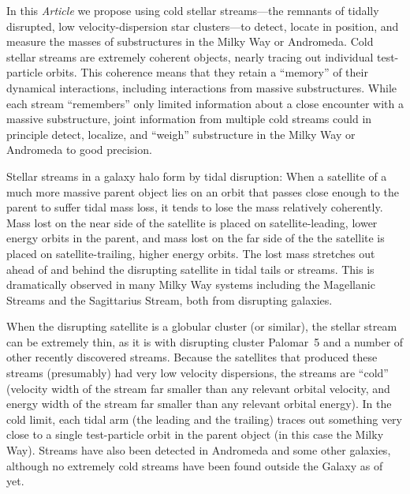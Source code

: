 \documentclass[12pt,preprint]{aastex}
\begin{document}
In this \textsl{Article} we propose using cold stellar streams---the
remnants of tidally disrupted, low velocity-dispersion star
clusters---to detect, locate in position, and measure the masses of
substructures in the Milky Way or Andromeda.  Cold stellar streams are
extremely coherent objects, nearly tracing out individual
test-particle orbits.  This coherence means that they retain a
``memory'' of their dynamical interactions, including interactions
from massive substructures.  While each stream ``remembers'' only
limited information about a close encounter with a massive
substructure, joint information from multiple cold streams could in
principle detect, localize, and ``weigh'' substructure in the Milky
Way or Andromeda to good precision.

Stellar streams in a galaxy halo form by tidal disruption: When a
satellite of a much more massive parent object lies on an orbit that
passes close enough to the parent to suffer tidal mass loss, it tends
to lose the mass relatively coherently.  Mass lost on the near side of
the satellite is placed on satellite-leading, lower energy orbits in
the parent, and mass lost on the far side of the the satellite is
placed on satellite-trailing, higher energy orbits.  The lost mass
stretches out ahead of and behind the disrupting satellite in tidal
tails or streams.  This is dramatically observed in many Milky Way
systems including the Magellanic Streams and the Sagittarius Stream,
both from disrupting galaxies.

When the disrupting satellite is a globular cluster (or similar), the
stellar stream can be extremely thin, as it is with disrupting cluster
Palomar~5 and a number of other recently discovered streams.  Because
the satellites that produced these streams (presumably) had very low
velocity dispersions, the streams are ``cold'' (velocity width of the
stream far smaller than any relevant orbital velocity, and energy
width of the stream far smaller than any relevant orbital energy).  In
the cold limit, each tidal arm (the leading and the trailing) traces
out something very close to a single test-particle orbit in the parent
object (in this case the Milky Way).  Streams have also been detected
in Andromeda and some other galaxies, although no extremely cold
streams have been found outside the Galaxy as of yet.
\end{document}

